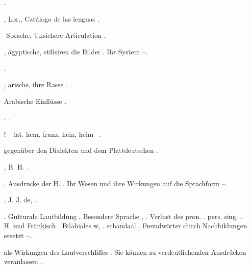\begin{register}

 \pageref{sp.20}.

, Lor., Catálogo de las lenguas \pageref{sp.27}.



-Sprache. Unsichere Articulation \pageref{sp.194}.

, ägyptische, stilisiren die Bilder \pageref{sp.129}. Ihr System \pageref{sp.130}–\pageref{sp.131}.

 \pageref{sp.261}.


, arische, ihre Rasse \pageref{sp.147}.

 Arabische Einflüsse \pageref{sp.271}.

. \pageref{sp.261}.



! – lat. hem, franz. hein, heim \pageref{sp.208}–\pageref{sp.209}.

 gegenüber den Dialekten und dem Plattdeutschen \pageref{sp.55}.

, B. H. \pageref{sp.69}.

. Ausdrücke der H. \pageref{sp.107}.  Ihr Wesen und ihre Wirkungen auf die Sprachform \pageref{sp.474}–\pageref{sp.475}.


, J. J. de, \pageref{sp.193}.

. Gutturale Lautbildung \pageref{sp.34}. Besondere Sprache \pageref{sp.55}, \pageref{sp.57}. Verlust des pron. \pageref{sp.2}. pers. sing. \pageref{sp.152}. H. und Fränkisch \pageref{sp.159}. Bilabiales w, \pageref{sp.188}.  schandaal \pageref{sp.217}. Fremdwörter durch Nachbildungen ersetzt \pageref{sp.262}–\pageref{sp.263}.

 als Wirkungen des Lautverschliffes \pageref{sp.178}. Sie können zu verdeutlichenden Ausdrücken veranlassen \pageref{sp.243}.


\end{register}
